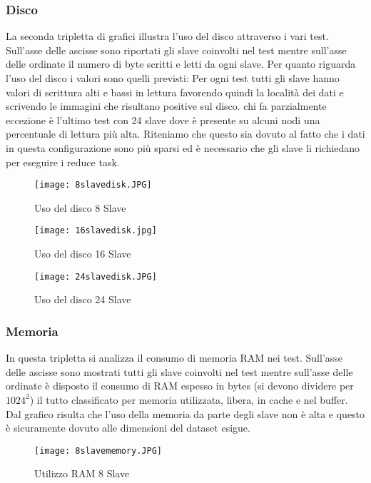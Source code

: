 \subsubsection{Disco}
La seconda tripletta di grafici illustra l'uso del disco attraverso i vari test. Sull'asse delle ascisse sono riportati gli slave coinvolti nel test mentre sull'asse delle ordinate il numero di byte scritti e letti da ogni slave. Per quanto riguarda l'uso del disco i valori sono quelli previsti: Per ogni test tutti gli slave hanno valori di scrittura alti e bassi in lettura favorendo quindi la località dei dati e scrivendo le immagini che risultano positive sul disco. chi fa parzialmente eccezione è l'ultimo test con 24 slave dove è presente su alcuni nodi una percentuale di lettura più alta. Riteniamo che questo sia dovuto al fatto che i dati in questa configurazione sono più sparsi ed è necessario che gli slave li richiedano per eseguire i reduce task.
\begin{figure}[H]
	\begin{center}
		\texttt{[image: 8slavedisk.JPG]}
		\caption{Uso del disco 8 Slave}
		\label{fg:8slavedisk.jpg}
	\end{center}
\end{figure}

\begin{figure}[H]
	\begin{center}
		\texttt{[image: 16slavedisk.jpg]}
		\caption{Uso del disco 16 Slave}
		\label{fg:16slavedisk.jpg}
	\end{center}
\end{figure}

\begin{figure}[H]
	\begin{center}
		\texttt{[image: 24slavedisk.JPG]}
		\caption{Uso del disco 24 Slave}
		\label{fg:24slavedisk.jpg}
	\end{center}
\end{figure}

\subsubsection{Memoria}
In questa tripletta si analizza il consumo di memoria RAM nei test. Sull'asse delle ascisse sono mostrati tutti gli slave coinvolti nel test mentre sull'asse delle ordinate è disposto il consumo di RAM espesso in bytes (si devono dividere per $1024^2$) il tutto classificato per memoria utilizzata, libera, in cache e nel buffer. Dal grafico risulta che l'uso della memoria da parte degli slave non è alta e questo è sicuramente dovuto alle dimensioni del dataset esigue.
\begin{figure}[H]
	\begin{center}
		\texttt{[image: 8slavememory.JPG]}
		\caption{Utilizzo RAM 8 Slave}
		\label{fg:8slavememory.JPG}
	\end{center}
\end{figure}

